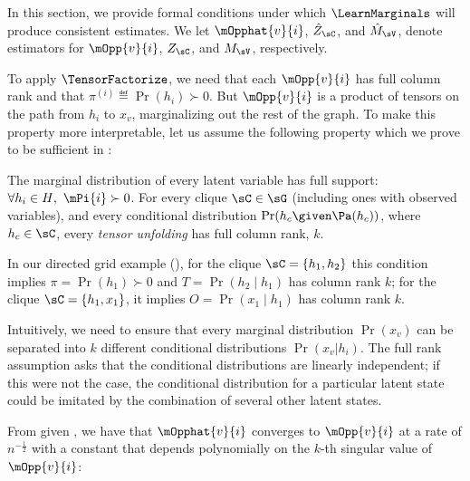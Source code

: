 In this section, we provide formal conditions under which $\LearnMarginals$
will produce consistent estimates.
We let
$\mOpphat{v}{i}$,
$\hat Z_\sC$,
and $\hat M_\sV$,
denote estimators for
$\mOpp{v}{i}$,
$Z_\sC$,
and $M_\sV$,
respectively.

To apply $\TensorFactorize$, we need that each $\mOpp{v}{i}$ has full
  column rank and that $\pi^{(i)} \eqdef \Pr(h_i) \succ 0$.
But $\mOpp{v}{i}$ is a product of tensors on the path from $h_i$ to
  $x_v$, marginalizing out the rest of the graph.
To make this property more interpretable, let us assume the following
  property which we prove to be sufficient in
  :
\begin{assumption} 
\label{asm:full-rank-plus}
The marginal distribution of every latent variable has full support:
  $\forall{h_i \in H},~ \mPi{i} \succ 0$.
For every clique $\sC \in \sG$ (including ones with observed variables),
  and every conditional distribution $\Pr(h_c \given \Pa(h_c))$, where
  $h_c \in \sC$, every {\em tensor unfolding} has full column rank, $k$.
\end{assumption}
In our directed grid example (), for the
  clique $\sC = \{ h_1, h_2 \}$ this condition implies $\pi = \Pr(h_1)
  \succ 0$ and $T = \Pr(h_2 \mid h_1)$ has column rank $k$; for the clique
  $\sC = \{ h_1, x_1 \}$, it implies $O = \Pr(x_1 \mid h_1)$ has column
  rank $k$.

Intuitively, we need to ensure that every marginal distribution
  $\Pr(x_v)$ can be separated into $k$ different conditional distributions
  $\Pr(x_v | h_i)$. 
The full rank assumption asks that the conditional distributions are
  linearly independent; if this were not the case, the conditional
  distribution for a particular latent state could be imitated by the
  combination of several other latent states.


From \citet{anandkumar13tensor} given , we
  have that $\mOpphat{v}{i}$ converges to $\mOpp{v}{i}$ at a rate of
  $n^{-\frac12}$ with a constant that depends polynomially on the $k$-th
  singular value of $\mOpp{v}{i}$:

